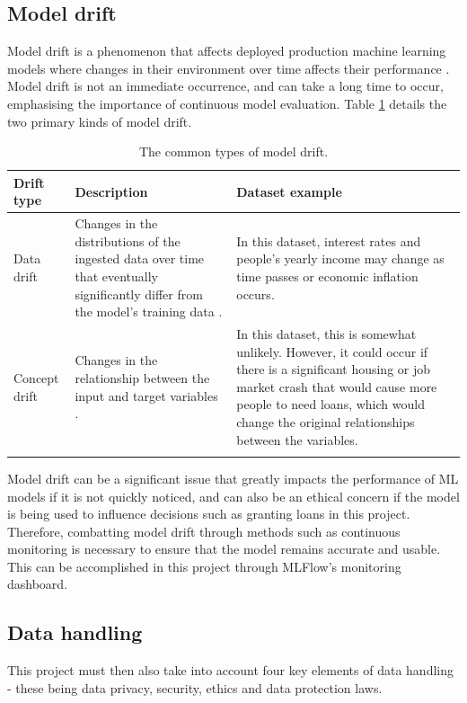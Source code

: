\documentclass[12pt]{report}
\newcommand{\para}{\vspace{7pt}\noindent}
\begin{document}
\subsection{Model drift}
Model drift is a phenomenon that affects deployed production machine learning models where changes in 
their environment over time affects their performance \autocite{nigenda_amazon_2022}. Model drift is not an 
immediate occurrence, and can take a long time to occur, emphasising the importance of continuous model evaluation. 
Table \ref{tab:Drift} details the two primary kinds of model drift.

\pagebreak

\begin{longtable}{ | p{} | p{} | p{} |}
    \hline
    \cellcolor{blue!25}Drift type & \cellcolor{blue!25}Description & \cellcolor{blue!25}Dataset example\\
    \hline
    Data drift & Changes in the distributions of the ingested data over time that eventually significantly differ from the model's training data \autocite{datacamp_understanding_nodate}.
    & In this dataset, interest rates and people's yearly income may change as time passes or economic inflation occurs.\\
    \hline
    Concept drift & Changes in the relationship between the input and target variables \autocite{nigenda_amazon_2022}. 
    & In this dataset, this is somewhat unlikely. However, it could occur if there is a significant housing or job market crash 
    that would cause more people to need loans, which would change the original relationships between the variables.\\
    \hline
\caption{The common types of model drift.}\label{tab:Drift}
\end{longtable}

\para Model drift can be a significant issue that greatly impacts the performance of ML models if it is not quickly noticed, and can 
also be an ethical concern if the model is being used to influence decisions such as granting loans in this project. 
Therefore, combatting model drift through methods such as continuous monitoring is necessary to ensure that the model remains accurate 
and usable. This can be accomplished in this project through MLFlow's monitoring dashboard.

\subsection{Data handling}
This project must then also take into account four key elements of data handling - these being data privacy, security, 
ethics and data protection laws. 
\end{document}
